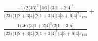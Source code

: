 \documentclass[varwidth, border=5pt]{standalone}
\begin{document}
\begin{my}
$\begin{gathered}
\scriptscriptstyle\frac{-1/2⟨46⟩^2[56]⟨3|1+2|4]^3}{⟨23⟩⟨1|2+3|4]⟨2|1+3|4]⟨4|5+6|4]^2s_{123}}+\\
\scriptscriptstyle\frac{1⟨46⟩⟨3|1+2|4]^3⟨2|1+3|5]}{⟨23⟩⟨1|2+3|4]⟨2|1+3|4]^2⟨4|5+6|4]s_{123}}\phantom{+}
\end{gathered}$
\end{my}
\end{document}
